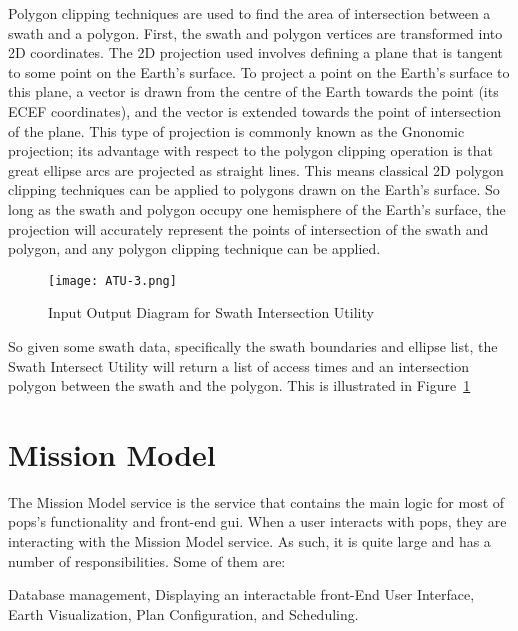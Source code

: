 Polygon clipping techniques are used to find the area of intersection between a
swath and a polygon. First, the swath and polygon vertices are transformed into
2D coordinates. The 2D projection used involves defining a plane that is
tangent to some point on the Earth’s surface.  To project a point on the
Earth’s surface to this plane, a vector is drawn from the centre of the Earth
towards the point (its ECEF coordinates), and the vector is extended towards
the point of intersection of the plane. This type of projection is commonly
known as the Gnonomic projection; its advantage with respect to the polygon
clipping operation is that great ellipse arcs are projected as straight lines.
This means classical 2D polygon clipping techniques can be applied to polygons
drawn on the Earth’s surface. So long as the swath and polygon occupy one
hemisphere of the Earth’s surface, the projection will accurately represent the
points of intersection of the swath and polygon, and any polygon clipping
technique can be applied.


\begin{figure}[h]
    \centering
    \texttt{[image: ATU-3.png]} 
    \caption{Input Output Diagram for Swath Intersection Utility}
    \label{fig:atu-3} 
\end{figure}

So given some swath data, specifically the swath boundaries and ellipse list,
the Swath Intersect Utility will return a list of access times and an
intersection polygon between the swath and the polygon. This is illustrated in
Figure~\ref{fig:atu-3}


\section{Mission Model}
 
The Mission Model service is the service that contains the main logic for most
of \gls{pops}'s functionality and front-end \gls{gui}. When a user interacts
with \gls{pops}, they are interacting with the Mission Model service. As such,
it is quite large and has a number of responsibilities. Some of them are:

\begin{outline} 
    \1 Database management,
    \1 Displaying an interactable front-End User Interface,
    \1 Earth Visualization,
    \1 Plan Configuration, and
    \1 Scheduling.
\end{outline}


